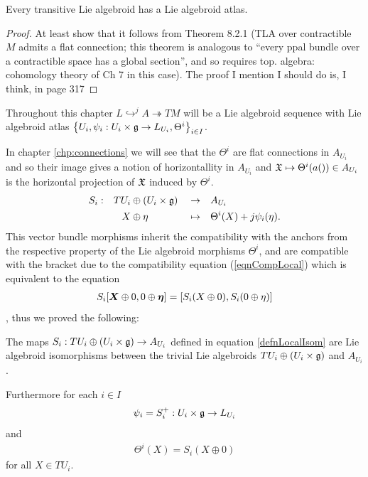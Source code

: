 \begin{theorem}
Every transitive Lie algebroid has a Lie algebroid atlas.
\end{theorem}
\begin{proof}
At least show that it follows from Theorem 8.2.1 (TLA over contractible $M$ admits a flat connection; this theorem is analogous to ``every ppal bundle over a contractible space has a global section'', and so requires top. algebra: cohomology theory of Ch 7 in this case). The proof I mention I should do is, I think, in page 317
\end{proof}

Throughout this chapter $L \hookrightarrow^j A \twoheadrightarrow TM$ will be a Lie algebroid sequence with Lie algebroid atlas $\left\{ U_i, \psi_i:U_i \times \mathfrak{g}\to L_{U_i}, \Theta^i \right\}_{i \in I}$.

In chapter \ref{chp:connections} we will see that the $\Theta^i$ are flat connections in $A_{U_i}$ and so their image gives a notion of horizontallity in $A_{U_i}$ and $ \mathfrak{X} \mapsto \Theta^i(a(\mathfrak{)}) \in A_{U_i}$ is the horizontal projection of $\mathfrak{X}$ induced by $\Theta^i$.
\begin{align}\label{defnLocalIsom}
    S_i:&& TU_i &\oplus (U_i \times \mathfrak{g}) &&\to&& A_{U_i}\\
        && X &\oplus \eta && \mapsto && \Theta^i(X) + j\psi_i(\eta).
\end{align}
This vector bundle morphisms inherit the compatibility with the anchors from the respective property of the Lie algebroid morphisms $\Theta^i$, and are compatible with the bracket due to the compatibility equation (\ref{eqnCompLocal}) which is equivalent to the equation
\begin{align*}
    S_i[\bm{X} \oplus 0, 0 \oplus \bm{\eta}] = [S_i(X \oplus 0), S_i(0 \oplus \eta)]
\end{align*}, thus we proved the following:

\begin{theorem}
The maps $S_i : TU_i \oplus (U_i \times \mathfrak{g}) \to A_{U_i}$ defined in equation \ref{defnLocalIsom} are Lie algebroid isomorphisms between the trivial Lie algebroids $TU_i \oplus (U_i \times \mathfrak{g})$ and $A_{U_i}$.

Furthermore for each $i \in I$ 
\begin{align*}
    \psi_i = S_i^+: U_i \times \mathfrak{g} \to L_{U_i}
\end{align*} and 
\begin{align*}
    \Theta^i(X) = S_i(X \oplus 0)
\end{align*}
for all $X \in TU_i$.
\end{theorem}

